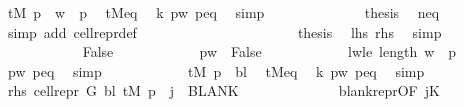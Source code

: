 \begin{isabellebody}
\ {\isachardoublequoteopen}{\isacharquery}{\kern0pt}tM\ p\ {\isacharequal}{\kern0pt}\ w\ {\isacharbang}{\kern0pt}\ p{}{\isachardoublequoteclose}\ \isamarkupfalse%
\ tM{\isacharunderscore}{\kern0pt}eq\ \isamarkupfalse%
\ k{}\ pw\ p{\isacharunderscore}{\kern0pt}eq\ \isamarkupfalse%
\ simp\isanewline
\ \ \ \ \ \ \ \ \ \ \ \ \isamarkupfalse%
\ {\isacharquery}{\kern0pt}thesis\ \isamarkupfalse%
\ neq\ \isamarkupfalse%
\ {\isacharparenleft}{\kern0pt}simp\ add{\isacharcolon}{\kern0pt}\ cell{\isacharunderscore}{\kern0pt}repr{\isacharunderscore}{\kern0pt}def{\isacharparenright}{\kern0pt}\isanewline
\ \ \ \ \ \ \ \ \ \ \isamarkupfalse%
\isanewline
\ \ \ \ \ \ \ \ \ \ \isamarkupfalse%
\ {\isacharquery}{\kern0pt}thesis\ \isamarkupfalse%
\ lhs\ rhs\ \isamarkupfalse%
\ simp\isanewline
\ \ \ \ \ \ \ \ \isamarkupfalse%
\isanewline
\ \ \ \ \ \ \ \ \ \ \isamarkupfalse%
\ False\isanewline
\ \ \ \ \ \ \ \ \ \ \isamarkupfalse%
\ pw\ {\isacharequal}{\kern0pt}\ False\isanewline
\ \ \ \ \ \ \ \ \ \ \isamarkupfalse%
\ lwle{\isacharcolon}{\kern0pt}\ {\isachardoublequoteopen}length\ w\ {\isasymle}\ p{}{\isachardoublequoteclose}\ \isamarkupfalse%
\ pw\ p{\isacharunderscore}{\kern0pt}eq\ \isamarkupfalse%
\ simp\isanewline
\ \ \ \ \ \ \ \ \ \ \isamarkupfalse%
\ {\isachardoublequoteopen}{\isacharquery}{\kern0pt}tM\ p\ {\isacharequal}{\kern0pt}\ {\isacharquery}{\kern0pt}bl{\isachardoublequoteclose}\ \isamarkupfalse%
\ tM{\isacharunderscore}{\kern0pt}eq\ \isamarkupfalse%
\ k{}\ pw\ p{\isacharunderscore}{\kern0pt}eq\ \isamarkupfalse%
\ simp\isanewline
\ \ \ \ \ \ \ \ \ \ \isamarkupfalse%
\ rhs{\isacharcolon}{\kern0pt}\ {\isachardoublequoteopen}cell{\isacharunderscore}{\kern0pt}repr\ {\isacharquery}{\kern0pt}G\ {\isacharquery}{\kern0pt}bl\ {\isacharparenleft}{\kern0pt}{\isacharquery}{\kern0pt}tM\ p{\isacharparenright}{\kern0pt}\ {\isacharbang}{\kern0pt}\ j\ {\isacharequal}{\kern0pt}\ BLANK{}{\isachardoublequoteclose}\isanewline
\ \ \ \ \ \ \ \ \ \ \ \ \isamarkupfalse%
\ blank{\isacharunderscore}{\kern0pt}repr{\isacharbrackleft}{\kern0pt}OF\ jK{\isacharbrackright}{\kern0pt}\ \isamarkupfalse%

\end{isabellebody}
